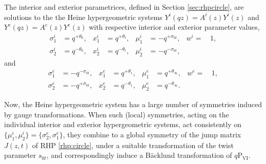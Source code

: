 \documentclass[a4paper,reqno,11pt]{amsart}
\numberwithin{equation}{section}
\numberwithin{figure}{section}
\theoremstyle{plain}
\theoremstyle{remark}
\newcommand\Psix{\textrm{P}_{\textrm{VI}}}
\newcounter{rhp}
\numberwithin{rhp}{section}
\begin{document}
The interior and exterior parametrices, defined in Section \ref{sec:rhpcircle}, are solutions to the the Heine hypergeometric systems $Y^i(qz)=A^i(z)Y^i(z)$ and $Y^e(qz)=A^e(z)Y^e(z)$
with respective interior and exterior parameter values,
    \begin{align*}
    \sigma_1^i&=q^{+\theta_0}, &  x_1^i&=q^{+\theta_t}, &   \mu_1^i&=-q^{+\sigma_{0t}}, & w^i=&\,1,\\
    \sigma_2^i&=q^{-\theta_0}, &  x_2^i&=q^{-\theta_t}, & \mu_2^i&=-q^{-\sigma_{0t}}, & &
    \end{align*}
    and
    \begin{align*}
    \sigma_1^e&=-q^{-\sigma_{0t}}, &  x_1^e&=q^{+\theta_1}, &   \mu_1^e&=q^{+\theta_\infty}, & w^e=&\,1,\\
    \sigma_2^e&=-q^{+\sigma_{0t}}, &  x_2^e&=q^{-\theta_1}, & \mu_2^e&=q^{-\theta_\infty}. & &
    \end{align*}

Now, the Heine hypergeometric system has a large number of symmetries induced by gauge transformations. When such (local) symmetries, acting on the individual interior and exterior hypergeometric systems,  act consistently on $\{\mu_1^i,\mu_2^i\}=\{\sigma_2^e,\sigma_1^e\}$, they combine to a global symmetry of the jump matrix $J(z,t)$ of RHP \ref{rhp:circle}, under a suitable transformation of the twist parameter $s_{0t}$, and correspondingly induce a B\"acklund transformation of $q\Psix$.
\end{document}
